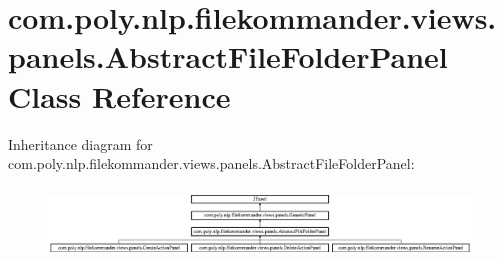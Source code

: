 \hypertarget{classcom_1_1poly_1_1nlp_1_1filekommander_1_1views_1_1panels_1_1_abstract_file_folder_panel}{\section{com.\-poly.\-nlp.\-filekommander.\-views.\-panels.\-Abstract\-File\-Folder\-Panel Class Reference}
\label{classcom_1_1poly_1_1nlp_1_1filekommander_1_1views_1_1panels_1_1_abstract_file_folder_panel}
}
Inheritance diagram for com.\-poly.\-nlp.\-filekommander.\-views.\-panels.\-Abstract\-File\-Folder\-Panel\-:\begin{figure}[H]
\begin{center}
\leavevmode
\includegraphics[height=1.890295cm]{classcom_1_1poly_1_1nlp_1_1filekommander_1_1views_1_1panels_1_1_abstract_file_folder_panel}
\end{center}
\end{figure}
